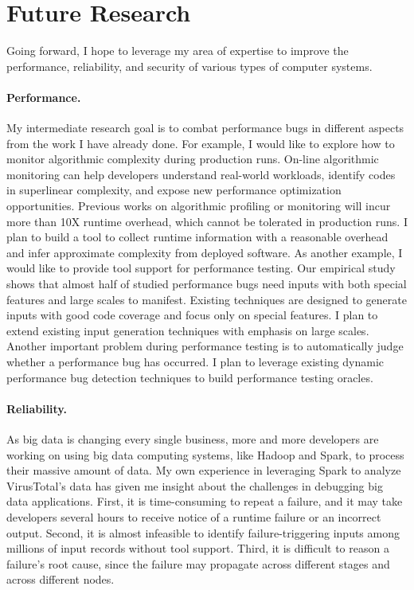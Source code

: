 \documentclass[10pt]{article}
\begin{document}
\section{Future Research}

Going forward, I hope to leverage my area of expertise to improve the performance, 
reliability, and security of various types of computer systems. 

\vspace{-.1in}
\paragraph{Performance.} 
My intermediate research goal is to combat performance bugs 
in different aspects from the work I have already done.
For example, I would like to explore how to monitor algorithmic complexity during production runs. 
On-line algorithmic monitoring can help developers understand real-world workloads, 
identify codes in superlinear complexity, 
and expose new performance optimization opportunities. 
Previous works on algorithmic profiling or monitoring will incur more than 10X runtime overhead, which cannot be tolerated in production runs. 
I plan to build a tool to collect runtime information with a reasonable overhead 
and infer approximate complexity from deployed software. 
As another example, I would like to provide tool support for performance testing.
Our empirical study shows that almost half of studied performance bugs need inputs with both special features and large scales to manifest. 
Existing techniques are designed to generate inputs with good code coverage and focus only on special features.
I plan to extend existing input generation techniques with emphasis on large scales. 
Another important problem during performance testing is to automatically judge whether a performance bug has occurred. 
I plan to leverage existing dynamic performance bug detection techniques to build performance testing oracles.

\vspace{-.1in}
\paragraph{Reliability.} 
As big data is changing every single business, 
more and more developers are working on using big data computing systems, 
like Hadoop and Spark, to process their massive amount of data. 
My own experience in leveraging Spark to analyze VirusTotal's data 
has given me insight about the challenges in debugging big data applications. 
First, it is time-consuming to repeat a failure, and it may take developers several hours to receive notice of a runtime failure or an incorrect output.
Second, it is almost infeasible to identify failure-triggering inputs among millions of input records without tool support. 
Third, it is difficult to reason a failure's root cause, since the failure may propagate across different stages and across different nodes.
\end{document}
